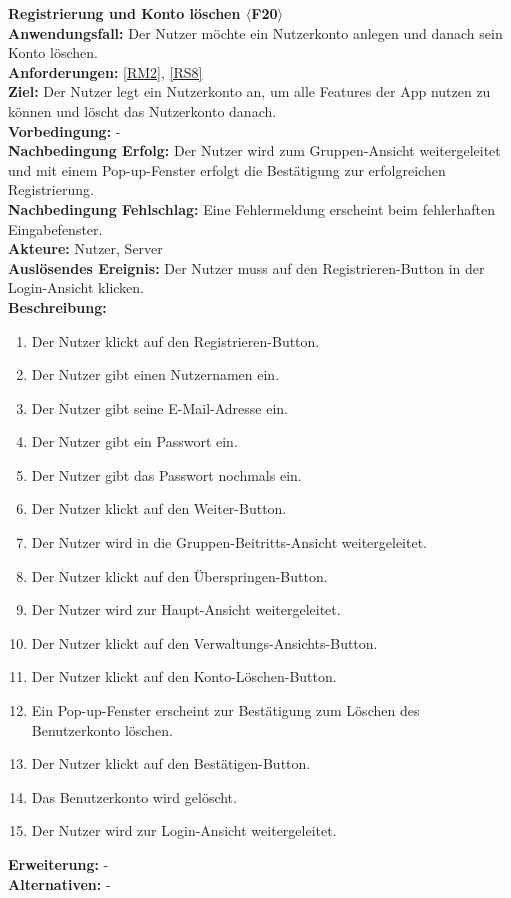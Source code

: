 \documentclass[parskip=full]{scrartcl}
\begin{document}
\textbf{Registrierung und Konto löschen $\langle$F20$\rangle$}\\
\textbf{Anwendungsfall:} Der Nutzer möchte ein Nutzerkonto anlegen und danach sein Konto löschen.\\
\textbf{Anforderungen:} \ref{RM2}, \ref{RS8} \\
\textbf{Ziel:} Der Nutzer legt ein Nutzerkonto an, um alle Features der App nutzen zu können und löscht das Nutzerkonto danach.\\
\textbf{Vorbedingung:} -\\
\textbf{Nachbedingung Erfolg:} Der Nutzer wird zum Gruppen-Ansicht weitergeleitet und mit einem Pop-up-Fenster erfolgt die Bestätigung zur erfolgreichen Registrierung.\\
\textbf{Nachbedingung Fehlschlag:} Eine Fehlermeldung erscheint beim fehlerhaften Eingabefenster.\\
\textbf{Akteure:} Nutzer, Server\\
\textbf{Auslösendes Ereignis:} Der Nutzer muss auf den Registrieren-Button in der Login-Ansicht klicken.\\
\textbf{Beschreibung:}
\begin{enumerate}
    \item Der Nutzer klickt auf den Registrieren-Button.
    \item Der Nutzer gibt einen Nutzernamen ein.
    \item Der Nutzer gibt seine E-Mail-Adresse ein.
    \item Der Nutzer gibt ein Passwort ein.
    \item Der Nutzer gibt das Passwort nochmals ein.
    \item Der Nutzer klickt auf den Weiter-Button.
    \item Der Nutzer wird in die Gruppen-Beitritts-Ansicht weitergeleitet.
    \item Der Nutzer klickt auf den Überspringen-Button.
    \item Der Nutzer wird zur Haupt-Ansicht weitergeleitet.
    \item Der Nutzer klickt auf den Verwaltungs-Ansichts-Button.
    \item Der Nutzer klickt auf den Konto-Löschen-Button.
    \item Ein Pop-up-Fenster erscheint zur Bestätigung zum Löschen des Benutzerkonto löschen.
    \item Der Nutzer klickt auf den Bestätigen-Button.
    \item Das Benutzerkonto wird gelöscht.
    \item Der Nutzer wird zur Login-Ansicht weitergeleitet.
\end{enumerate}
\textbf{Erweiterung:} -\\
\textbf{Alternativen:} -
\newpage
\end{document}
